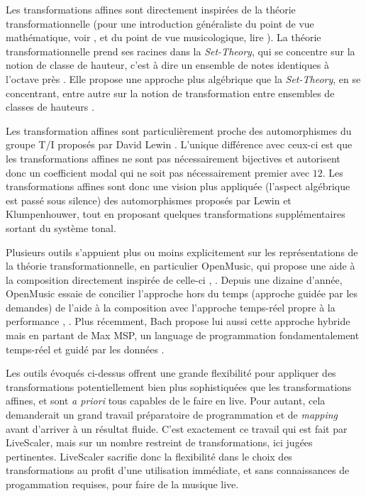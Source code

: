 Les transformations affines sont directement inspirées de la théorie transformationnelle  (pour une introduction généraliste du point de vue mathématique, voir \cite{andreatta2008calcul}, et du point de vue musicologique, lire \cite{andreatta2014introduction}). La théorie transformationnelle prend ses racines dans la \emph{Set-Theory}, qui se concentre sur la notion de classe de hauteur, c'est à dire un ensemble de notes identiques à l'octave près \cite{forte1973structure}. Elle propose une approche plus algébrique que la \emph{Set-Theory}, en se concentrant, entre autre sur la notion de transformation entre ensembles de classes de hauteurs \cite{lewin1987generalized}. 

Les transformation affines sont particulièrement proche des automorphismes du groupe T/I proposés par David Lewin \cite{lewin1990klumpenhouwer}. L'unique différence avec ceux-ci est que les transformations affines ne sont pas nécessairement bijectives et autorisent donc un coefficient modal qui ne soit pas nécessairement premier avec $12$. Les transformations affines sont donc  une vision plus appliquée (l'aspect algébrique est passé sous silence) des automorphismes proposés par Lewin et Klumpenhouwer, tout en proposant quelques transformations supplémentaires sortant du système tonal.


Plusieurs outils s'appuient plus ou moins explicitement sur les représentations de la théorie transformationnelle, en particulier OpenMusic, qui propose une aide à la composition directement inspirée de celle-ci \cite{andreatta2003implementing}, \cite{andreatta2003formalisation}. Depuis une dizaine d'année, OpenMusic essaie de concilier l'approche hors du temps (approche guidée par les demandes) de l'aide à la composition avec l'approche temps-réel propre à la performance \cite{bresson2014reactive}, \cite{bresson2017next}. Plus récemment, Bach propose lui aussi cette approche hybride mais en partant de Max MSP, un language de programmation fondamentalement temps-réel et guidé par les données \cite{agostini2021programming}.

Les outils évoqués ci-dessus offrent une grande flexibilité pour appliquer des transformations potentiellement bien plus sophistiquées que les transformations affines, et sont \emph{a priori} tous capables de le faire en live. Pour autant, cela demanderait un grand travail préparatoire de programmation et de \emph{mapping} avant d'arriver à un résultat fluide. C'est exactement ce travail qui est fait par LiveScaler, mais sur un nombre restreint de transformations, ici jugées pertinentes. LiveScaler sacrifie donc la flexibilité dans le choix des transformations au profit d'une utilisation immédiate, et sans connaissances de progammation requises, pour faire de la musique live.

